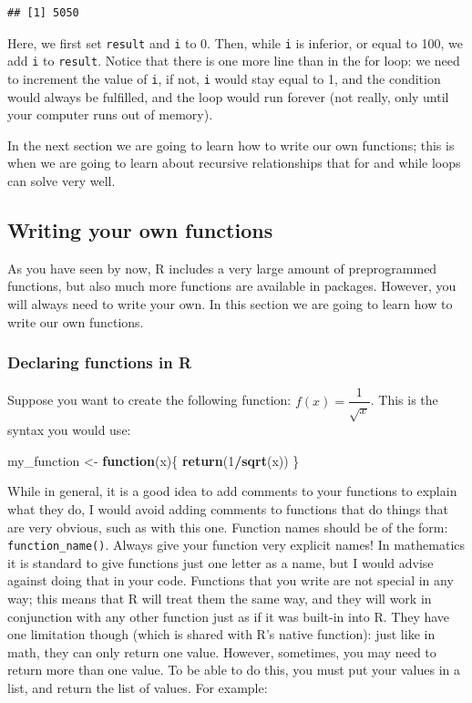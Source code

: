 \documentclass[]{gitbook}
\newenvironment{Shaded}{\begin{snugshade}}{\end{snugshade}}
\newcommand{\ControlFlowTok}[1]{\textcolor[rgb]{0.13,0.29,0.53}{\textbf{#1}}}
\newcommand{\DecValTok}[1]{\textcolor[rgb]{0.00,0.00,0.81}{#1}}
\newcommand{\KeywordTok}[1]{\textcolor[rgb]{0.13,0.29,0.53}{\textbf{#1}}}
\newcommand{\NormalTok}[1]{#1}
\newcommand{\OperatorTok}[1]{\textcolor[rgb]{0.81,0.36,0.00}{\textbf{#1}}}
\newcommand{\StringTok}[1]{\textcolor[rgb]{0.31,0.60,0.02}{#1}}
\theoremstyle{definition}
\theoremstyle{definition}
\theoremstyle{definition}
\theoremstyle{remark}
\begin{document}
\begin{verbatim}
## [1] 5050
\end{verbatim}

Here, we first set \texttt{result} and \texttt{i} to 0. Then, while
\texttt{i} is inferior, or equal to 100, we add \texttt{i} to
\texttt{result}. Notice that there is one more line than in the for
loop: we need to increment the value of \texttt{i}, if not, \texttt{i}
would stay equal to 1, and the condition would always be fulfilled, and
the loop would run forever (not really, only until your computer runs
out of memory).

In the next section we are going to learn how to write our own
functions; this is when we are going to learn about recursive
relationships that for and while loops can solve very well.

\hypertarget{writing-your-own-functions}{%
\subsection{Writing your own
functions}\label{writing-your-own-functions}}

As you have seen by now, R includes a very large amount of preprogrammed
functions, but also much more functions are available in packages.
However, you will always need to write your own. In this section we are
going to learn how to write our own functions.

\hypertarget{declaring-functions-in-r}{%
\subsubsection{Declaring functions in
R}\label{declaring-functions-in-r}}

Suppose you want to create the following function:
\(f(x) = \dfrac{1}{\sqrt{x}}\). This is the syntax you would use:

\begin{Shaded}
\begin{Highlighting}[]
\NormalTok{my_function <-}\StringTok{ }\ControlFlowTok{function}\NormalTok{(x)\{}
\KeywordTok{return}\NormalTok{(}\DecValTok{1}\OperatorTok{/}\KeywordTok{sqrt}\NormalTok{(x))}
\NormalTok{\}}
\end{Highlighting}
\end{Shaded}

While in general, it is a good idea to add comments to your functions to
explain what they do, I would avoid adding comments to functions that do
things that are very obvious, such as with this one. Function names
should be of the form: \texttt{function\_name()}. Always give your
function very explicit names! In mathematics it is standard to give
functions just one letter as a name, but I would advise against doing
that in your code. Functions that you write are not special in any way;
this means that R will treat them the same way, and they will work in
conjunction with any other function just as if it was built-in into R.
They have one limitation though (which is shared with R's native
function): just like in math, they can only return one value. However,
sometimes, you may need to return more than one value. To be able to do
this, you must put your values in a list, and return the list of values.
For example:
\end{document}
